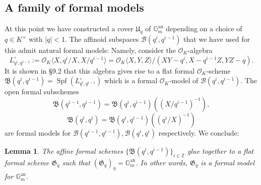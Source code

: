 \documentclass[10pt,oneside]{amsart}
\newtheorem{lemma}[theorem]{Lemma}
\theoremstyle{definition}
\begin{document}
	\subsection{A family of formal models}
	At this point we have constructed a cover $\mathfrak U_q$ of $\mathbb G_m^{\operatorname{an}}$ depending on a choice of $q\in K^\times$ with $|q|<1$. 
	The affinoid subspaces $\mathcal B(q^i,q^{i-1})$ that we have used for this admit natural formal models: Namely, consider the $\mathcal O_K$-algebra
	\[L_{q^i,q^{i-1}}^\circ :=\mathcal O_K\langle X,q^i/X, X/q^{i-1}\rangle = \mathcal O_K\langle X,Y,Z\rangle/(XY-q^i, X-q^{i-1}Z, YZ-q).\]
	It is shown in \cite{Bosch lectures} \S 9.2 that this algebra gives rise to a flat formal $\mathcal O_K$-scheme $\mathfrak B(q^i,q^{i-1})=\operatorname{Spf}(L_{q^i,q^{i-1}}^\circ)$ which is a formal $\mathcal O_K$-model of $\mathcal B(q^i,q^{i-1})$. The open formal subschemes 
	\[\mathfrak B(q^{i-1},q^{i-1})=\mathfrak B(q^i,q^{i-1})((X/q^{i-1})^{-1}),\]
	\[\mathfrak B(q^{i},q^{i})=\mathfrak B(q^i,q^{i-1})((q^{i}/X)^{-1})\]		
	are formal models for $\mathcal B(q^{i-1},q^{i-1}), \mathcal B(q^i,q^i)$ respectively. We conclude:

	\begin{lemma}\label{formal model of torus}
		The affine formal schemes $\{\mathfrak B(q^i,q^{i-1})\}_{i\in\mathbb Z}$ glue together to a flat formal scheme $\mathfrak G_q$ such that $(\mathfrak G_q)_\eta = \mathbb G_m^{\operatorname{an}}$. In other words, $\mathfrak G_q$ is a formal model for $\mathbb G_m^{\operatorname{an}}$.
	\end{lemma}
	
\end{document}
